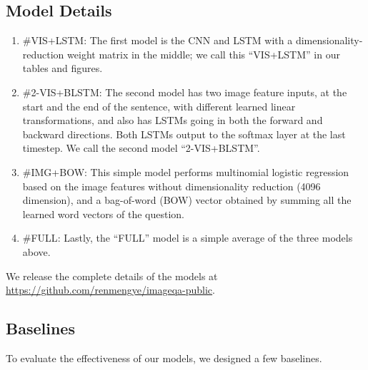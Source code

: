 \subsection{Model Details}
\begin{enumerate}[leftmargin=*]
\item \#{VIS+LSTM}: The first model is the CNN and LSTM with a
dimensionality-reduction weight matrix in the middle; we call this ``VIS+LSTM''
in our tables and figures.

\item \#{2-VIS+BLSTM}: The second model has two image feature inputs, at the
start and the end of the sentence, with different learned linear
transformations, and also has LSTMs going in both the forward and backward
directions. Both LSTMs output to the softmax layer at the last timestep. We
call the second model ``2-VIS+BLSTM''.

\item \#{IMG+BOW}: This simple model performs multinomial logistic regression
based on the image features without dimensionality reduction (4096 dimension),
and a bag-of-word (BOW) vector obtained by summing all the learned word vectors
of the question.

\item \#{FULL}: Lastly, the ``FULL'' model is a simple average of the three
models above.
\end{enumerate}

We release the complete details of the models at
\url{https://github.com/renmengye/imageqa-public}.

\subsection{Baselines}
To evaluate the effectiveness of our models, we designed a few baselines.

